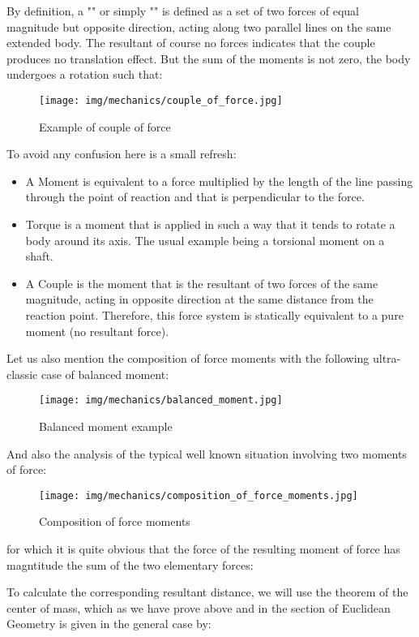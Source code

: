 	By definition, a "" or simply "" is defined as a set of two forces of equal magnitude but opposite direction, acting along two parallel lines on the same extended body. The resultant of course no forces indicates that the couple produces no translation effect. But the sum of the moments is not zero, the body undergoes a rotation such that:
	
	\begin{figure}[H]
		\centering
		\texttt{[image: img/mechanics/couple\_of\_force.jpg]}
		\caption{Example of couple of force}
	\end{figure}
	To avoid any confusion here is a small refresh:
	\begin{itemize}
		\item A Moment is equivalent to a force multiplied by the length of the line passing through the point of reaction and that is perpendicular to the force.

		\item Torque is a moment that is applied in such a way that it tends to rotate a body around its axis. The usual example being a torsional moment on a shaft.

		\item  A Couple is the moment that is the resultant of two forces of the same magnitude, acting in opposite direction at the same distance from the reaction point. Therefore, this force system is statically equivalent to a pure moment (no resultant force).
	\end{itemize}
	Let us also mention the composition of force moments with the following ultra-classic case of balanced moment:
	\begin{figure}[H]
		\centering
		\texttt{[image: img/mechanics/balanced\_moment.jpg]}
		\caption{Balanced moment example}
	\end{figure}
	And also the analysis of the typical well known situation involving two moments of force:
	\begin{figure}[H]
		\centering
		\texttt{[image: img/mechanics/composition\_of\_force\_moments.jpg]}
		\caption[]{Composition of force moments}
	\end{figure}
	for which it is quite obvious that the force of the resulting moment of force has magntitude the sum of the two elementary forces:
	
	To calculate the corresponding resultant distance, we will use the theorem of the center of mass, which as we have prove above and in the section of Euclidean Geometry is given in the general case by:
	
